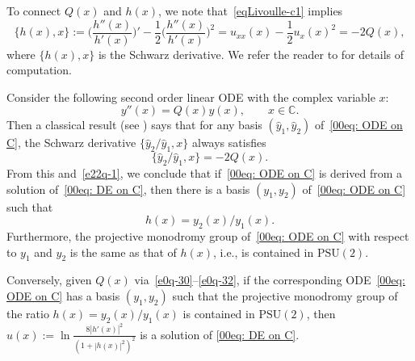 \documentclass[10pt,a4paper]{amsart}
\numberwithin{equation}{section}
\def\PSU{\mathrm{PSU}}
\begin{document}
To connect $Q(x)$ and $h(x)$, we note that~\eqref{eqLivoulle-c1} implies
\begin{equation}\label{e22q-1}
\{h(x),x\}:=\biggl(\frac{h''(x)}{h'(x)}\biggr)'-\frac12 \biggl(\frac{h''(x)}{h'(x)}\biggr)^2=u_{xx}(x)-\frac12 u_x(x)^2=-2Q(x),
\end{equation}
where $\{h(x),x\}$ is the Schwarz derivative. We refer the reader to
\cite{Chai-Lin-Wang} for details of computation.

Consider the following second order linear ODE with the complex variable $x$:
\begin{equation}\label{00eq: ODE on C}
y''(x)=Q(x)y(x),\qquad x\in\mathbb{C}.
\end{equation}
Then a classical result (see \cite{Whittaker-Watson}) says that for
any basis $(\hat{y}_1,\hat{y}_2)$ of~\eqref{00eq: ODE on C}, the
Schwarz derivative $\{\hat{y}_2/\hat{y}_1,x\}$ always satisfies
\begin{equation*}
\{\hat{y}_2/\hat{y}_1,x\}=-2Q(x).
\end{equation*}
From this and~\eqref{e22q-1}, we conclude that if~\eqref{00eq: ODE on
 C} is derived from a solution of~\eqref{00eq: DE on C}, then there
is a basis $(y_1,y_2)$ of~\eqref{00eq: ODE on C} such that
\begin{equation}\label{e22q-2}
h(x)=y_2(x)/y_1(x).
\end{equation}
Furthermore, the projective monodromy group of~\eqref{00eq: ODE on C}
with respect to $y_1$ and $y_2$ is the same as that of $h(x)$, i.e., is
contained in $\PSU(2)$.

Conversely, given $Q(x)$ via~\eqref{e0q-30}--\eqref{e0q-32}, if the
corresponding ODE~\eqref{00eq: ODE on C} has a basis $(y_1,y_2)$ such
that the projective monodromy group of the ratio $h(x)=y_2(x)/y_1(x)$
is contained in $\PSU(2)$, then
$u(x):=\ln\frac{8|h'(x)|^2}{(1+|h(x)|^2)^2}$ is a solution of
\eqref{00eq: DE on C}.
\end{document}
